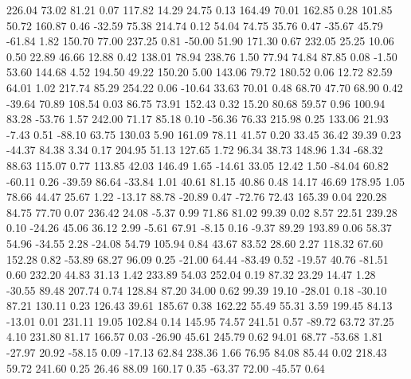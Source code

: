   226.04   73.02   81.21    0.07
  117.82   14.29   24.75    0.13
  164.49   70.01  162.85    0.28
  101.85   50.72  160.87    0.46
  -32.59   75.38  214.74    0.12
   54.04   74.75   35.76    0.47
  -35.67   45.79  -61.84    1.82
  150.70   77.00  237.25    0.81
  -50.00   51.90  171.30    0.67
  232.05   25.25   10.06    0.50
   22.89   46.66   12.88    0.42
  138.01   78.94  238.76    1.50
   77.94   74.84   87.85    0.08
   -1.50   53.60  144.68    4.52
  194.50   49.22  150.20    5.00
  143.06   79.72  180.52    0.06
   12.72   82.59   64.01    1.02
  217.74   85.29  254.22    0.06
  -10.64   33.63   70.01    0.48
   68.70   47.70   68.90    0.42
  -39.64   70.89  108.54    0.03
   86.75   73.91  152.43    0.32
   15.20   80.68   59.57    0.96
  100.94   83.28  -53.76    1.57
  242.00   71.17   85.18    0.10
  -56.36   76.33  215.98    0.25
  133.06   21.93   -7.43    0.51
  -88.10   63.75  130.03    5.90
  161.09   78.11   41.57    0.20
   33.45   36.42   39.39    0.23
  -44.37   84.38    3.34    0.17
  204.95   51.13  127.65    1.72
   96.34   38.73  148.96    1.34
  -68.32   88.63  115.07    0.77
  113.85   42.03  146.49    1.65
  -14.61   33.05   12.42    1.50
  -84.04   60.82  -60.11    0.26
  -39.59   86.64  -33.84    1.01
   40.61   81.15   40.86    0.48
   14.17   46.69  178.95    1.05
   78.66   44.47   25.67    1.22
  -13.17   88.78  -20.89    0.47
  -72.76   72.43  165.39    0.04
  220.28   84.75   77.70    0.07
  236.42   24.08   -5.37    0.99
   71.86   81.02   99.39    0.02
    8.57   22.51  239.28    0.10
  -24.26   45.06   36.12    2.99
   -5.61   67.91   -8.15    0.16
   -9.37   89.29  193.89    0.06
   58.37   54.96  -34.55    2.28
  -24.08   54.79  105.94    0.84
   43.67   83.52   28.60    2.27
  118.32   67.60  152.28    0.82
  -53.89   68.27   96.09    0.25
  -21.00   64.44  -83.49    0.52
  -19.57   40.76  -81.51    0.60
  232.20   44.83   31.13    1.42
  233.89   54.03  252.04    0.19
   87.32   23.29   14.47    1.28
  -30.55   89.48  207.74    0.74
  128.84   87.20   34.00    0.62
   99.39   19.10  -28.01    0.18
  -30.10   87.21  130.11    0.23
  126.43   39.61  185.67    0.38
  162.22   55.49   55.31    3.59
  199.45   84.13  -13.01    0.01
  231.11   19.05  102.84    0.14
  145.95   74.57  241.51    0.57
  -89.72   63.72   37.25    4.10
  231.80   81.17  166.57    0.03
  -26.90   45.61  245.79    0.62
   94.01   68.77  -53.68    1.81
  -27.97   20.92  -58.15    0.09
  -17.13   62.84  238.36    1.66
   76.95   84.08   85.44    0.02
  218.43   59.72  241.60    0.25
   26.46   88.09  160.17    0.35
  -63.37   72.00  -45.57    0.64
